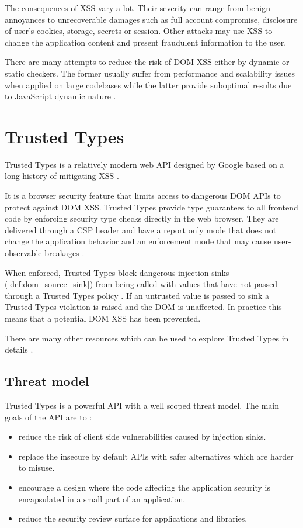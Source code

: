 The consequences of XSS vary a lot. Their severity can range from benign annoyances to unrecoverable
damages such as full account compromise, disclosure of user's cookies, storage, secrets or session.
Other attacks may use XSS to change the application content and present fraudulent information to the
user.

There are many attempts to reduce the risk of DOM XSS either by dynamic or static checkers. The
former usually suffer from performance and scalability issues when applied on large codebases while
the latter provide suboptimal results due to JavaScript dynamic nature
\cite{tt_web_framework_paper} \cite{owasp_xss_cheatsheet}.

\section{Trusted Types}

Trusted Types is a relatively modern web API designed by Google based on a long history of
mitigating XSS \cite{tt_design_history}.

It is a browser security feature that limits access to dangerous DOM APIs to protect against DOM
XSS. Trusted Types provide type guarantees to all frontend code by enforcing security type checks
directly in the web browser. They are delivered through a CSP header and have a report only mode
that does not change the application behavior and an enforcement mode that may cause user-observable
breakages \cite{tt_background}.

When enforced, Trusted Types block dangerous injection sinks (\ref{def:dom_source_sink}) from being
called with values that have not passed through a Trusted Types policy \cite{tt_background}. If an
untrusted value is passed to sink a Trusted Types violation is raised and the DOM is unaffected. In
practice this means that a potential DOM XSS has been prevented.

There are many other resources which can be used to explore Trusted Types in details
\cite{tt_resources}.

\subsection{Threat model}

Trusted Types is a powerful API with a well scoped threat model. The main goals of the API are to
\cite{tt_spec:goals}:

\begin{itemize}
  \item reduce the risk of client side vulnerabilities caused by injection sinks.
  \item replace the insecure by default APIs with safer alternatives which are harder to misuse.
  \item encourage a design where the code affecting the application security is encapsulated in a
        small part of an application.
  \item reduce the security review surface for applications and libraries.
\end{itemize}

